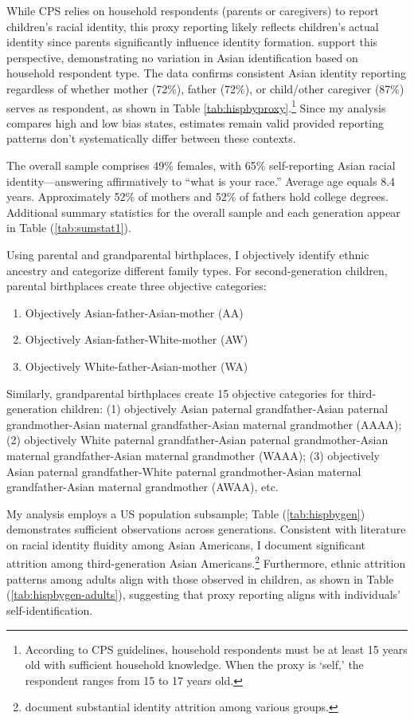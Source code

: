 While CPS relies on household respondents (parents or caregivers) to report children's racial identity, this proxy reporting likely reflects children's actual identity since parents significantly influence identity formation. \textcite{duncanIntermarriageIntergenerationalTransmission2011} support this perspective, demonstrating no variation in Asian identification based on household respondent type. The data confirms consistent Asian identity reporting regardless of whether mother (72\%), father (72\%), or child/other caregiver (87\%) serves as respondent, as shown in Table \ref{tab:hispbyproxy}.\footnote{According to CPS guidelines, household respondents must be at least 15 years old with sufficient household knowledge. When the proxy is `self,' the respondent ranges from 15 to 17 years old.} Since my analysis compares high and low bias states, estimates remain valid provided reporting patterns don't systematically differ between these contexts.

The overall sample comprises 49\% females, with 65\% self-reporting Asian racial identity—answering affirmatively to ``what is your race.'' Average age equals 8.4 years. Approximately 52\% of mothers and 52\% of fathers hold college degrees. Additional summary statistics for the overall sample and each generation appear in Table (\ref{tab:sumstat1}).

Using parental and grandparental birthplaces, I objectively identify ethnic ancestry and categorize different family types. For second-generation children, parental birthplaces create three objective categories:
\begin{enumerate}
\item Objectively Asian-father-Asian-mother (AA)
\item Objectively Asian-father-White-mother (AW)  
\item Objectively White-father-Asian-mother (WA)
\end{enumerate}

Similarly, grandparental birthplaces create 15 objective categories for third-generation children: (1) objectively Asian paternal grandfather-Asian paternal grandmother-Asian maternal grandfather-Asian maternal grandmother (AAAA); (2) objectively White paternal grandfather-Asian paternal grandmother-Asian maternal grandfather-Asian maternal grandmother (WAAA); (3) objectively Asian paternal grandfather-White paternal grandmother-Asian maternal grandfather-Asian maternal grandmother (AWAA), etc.

My analysis employs a US population subsample; Table (\ref{tab:hispbygen}) demonstrates sufficient observations across generations. Consistent with literature on racial identity fluidity among Asian Americans, I document significant attrition among third-generation Asian Americans.\footnote{\textcite{duncanIdentifyingLaterGenerationDescendants2018,duncanSocioeconomicIntegrationImmigrant2018, antmanEthnicAttritionObserved2016,antmanEthnicAttritionAssimilation2020} document substantial identity attrition among various groups.} Furthermore, ethnic attrition patterns among adults align with those observed in children, as shown in Table (\ref{tab:hispbygen-adults}), suggesting that proxy reporting aligns with individuals' self-identification. 

